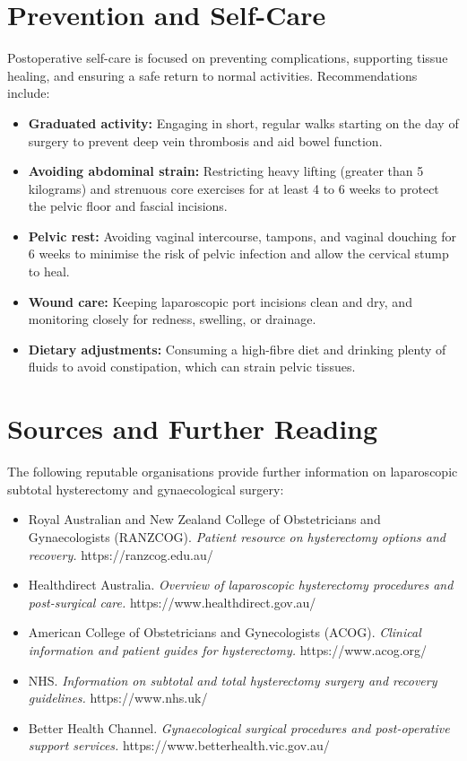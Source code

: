 \section*{Prevention and Self-Care}
Postoperative self-care is focused on preventing complications, supporting tissue healing, and ensuring a safe return to normal activities. Recommendations include:
\begin{itemize}
    \item \textbf{Graduated activity:} Engaging in short, regular walks starting on the day of surgery to prevent deep vein thrombosis and aid bowel function.
    \item \textbf{Avoiding abdominal strain:} Restricting heavy lifting (greater than 5 kilograms) and strenuous core exercises for at least 4 to 6 weeks to protect the pelvic floor and fascial incisions.
    \item \textbf{Pelvic rest:} Avoiding vaginal intercourse, tampons, and vaginal douching for 6 weeks to minimise the risk of pelvic infection and allow the cervical stump to heal.
    \item \textbf{Wound care:} Keeping laparoscopic port incisions clean and dry, and monitoring closely for redness, swelling, or drainage.
    \item \textbf{Dietary adjustments:} Consuming a high-fibre diet and drinking plenty of fluids to avoid constipation, which can strain pelvic tissues.
\end{itemize}

\section*{Sources and Further Reading}
The following reputable organisations provide further information on laparoscopic subtotal hysterectomy and gynaecological surgery:
\begin{itemize}
    \item Royal Australian and New Zealand College of Obstetricians and Gynaecologists (RANZCOG). \textit{Patient resource on hysterectomy options and recovery.} https://ranzcog.edu.au/
    \item Healthdirect Australia. \textit{Overview of laparoscopic hysterectomy procedures and post-surgical care.} https://www.healthdirect.gov.au/
    \item American College of Obstetricians and Gynecologists (ACOG). \textit{Clinical information and patient guides for hysterectomy.} https://www.acog.org/
    \item NHS. \textit{Information on subtotal and total hysterectomy surgery and recovery guidelines.} https://www.nhs.uk/
    \item Better Health Channel. \textit{Gynaecological surgical procedures and post-operative support services.} https://www.betterhealth.vic.gov.au/
\end{itemize}
